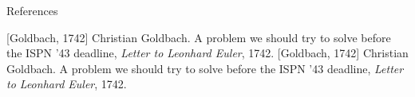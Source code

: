 \documentclass[xcolor=dvipsnames]{beamer}
\begin{document}
\begin{frame}{References}
\begin{thebibliography}{10}
[Goldbach, 1742]
Christian Goldbach.
\newblock A problem we should try to solve before the ISPN ’43 deadline,
\newblock \emph{Letter to Leonhard Euler}, 1742.
[Goldbach, 1742]
Christian Goldbach.
\newblock A problem we should try to solve before the ISPN ’43 deadline,
\newblock \emph{Letter to Leonhard Euler}, 1742.
\end{thebibliography}
\end{frame}
\end{document}
